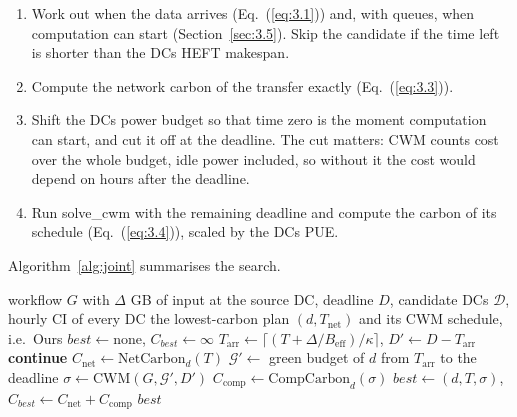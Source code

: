 \documentclass[12pt,a4paper,oneside,openany]{report}
\begin{document}
\begin{enumerate}
\def\labelenumi{\arabic{enumi}.}
\item
  Work out when the data arrives (Eq.~(\ref{eq:3.1})) and, with queues, when
  computation can start (Section~\ref{sec:3.5}). Skip the candidate if the time
  left is shorter than the DC\textquotesingle s HEFT makespan.
\item
  Compute the network carbon of the transfer exactly (Eq.~(\ref{eq:3.3})).
\item
  Shift the DC\textquotesingle s power budget so that time zero is the
  moment computation can start, and cut it off at the deadline. The cut
  matters: CWM counts cost over the whole budget, idle power included,
  so without it the cost would depend on hours after the deadline.
\item
  Run solve\_cwm with the remaining deadline and compute the carbon of
  its schedule (Eq.~(\ref{eq:3.4})), scaled by the DC\textquotesingle s PUE.
\end{enumerate}

Algorithm~\ref{alg:joint} summarises the search.

\begin{algorithm}[htbp]
\caption{Joint search over data centres and transfer start times}\label{alg:joint}
\begin{algorithmic}[1]
\Require workflow $G$ with $\Delta$ GB of input at the source DC, deadline $D$, candidate DCs $\mathcal{D}$, hourly CI of every DC
\Ensure the lowest-carbon plan $(d, T_{\mathrm{net}})$ and its CWM schedule, i.e.\ Ours
\State $\mathit{best} \gets \text{none}$, \quad $C_{\mathit{best}} \gets \infty$
    \State $T_{\mathrm{arr}} \gets \lceil (T + \Delta / B_{\mathrm{eff}}) / \kappa \rceil$, \quad $D' \gets D - T_{\mathrm{arr}}$ 
     \State \textbf{continue} 
    \EndIf
    \State $C_{\mathrm{net}} \gets \mathrm{NetCarbon}_d(T)$ 
    \State $\mathcal{G}' \gets$ green budget of $d$ from $T_{\mathrm{arr}}$ to the deadline
    \State $\sigma \gets \mathrm{CWM}(G, \mathcal{G}', D')$ 
    \State $C_{\mathrm{comp}} \gets \mathrm{CompCarbon}_d(\sigma)$ 
      \State $\mathit{best} \gets (d, T, \sigma)$, \quad $C_{\mathit{best}} \gets C_{\mathrm{net}} + C_{\mathrm{comp}}$
    \EndIf
  \EndFor
\EndFor
\State \Return $\mathit{best}$ 
\end{algorithmic}
\end{algorithm}
\end{document}
